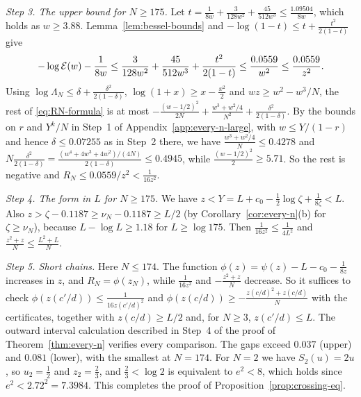 \emph{Step 3. The upper bound for $N\ge175$.} Let
$t=\frac1{8w}+\frac3{128w^2}+\frac{45}{512w^3}\le\frac{1.09504}{8w}$, which
holds as $w\ge3.88$. Lemma~\ref{lem:bessel-bounds} and
$-\log(1-t)\le t+\frac{t^2}{2(1-t)}$ give
\[
-\log \mathcal E(w)-\frac1{8w}\le\frac3{128w^2}+\frac{45}{512w^3}+\frac{t^2}{2(1-t)}\le\frac{0.0559}{w^2}
\le\frac{0.0559}{z^2}.
\]
Using $\log\Lambda_N\le\delta+\frac{\delta^2}{2(1-\delta)}$,
$\log(1+x)\ge x-\frac{x^2}2$ and $wz\ge w^2-w^3/N$, the rest of
\eqref{eq:RN-formula} is at most
$-\frac{(w-1/2)^2}{2N}+\frac{w^3+w^2/4}{N^2}+\frac{\delta^2}{2(1-\delta)}$. By
the bounds on $r$ and $Y^k/N$ in Step~1 of Appendix~\ref{app:every-n-large}, with
$w\le Y/(1-r)$ and hence $\delta\le0.07255$ as in Step~2 there, we have $\frac{w^3+w^2/4}N\le0.4278$ and
$N\frac{\delta^2}{2(1-\delta)}=\frac{(w^4+4w^3+4w^2)/(4N)}{2(1-\delta)}\le0.4945$,
while $\frac{(w-1/2)^2}2\ge5.71$. So the rest is negative and
$R_N\le0.0559/z^2<\frac1{16z^2}$.

\emph{Step 4. The form in $L$ for $N\ge175$.} We have
$z<Y=L+c_0-\frac12\log\zeta+\frac1{8\zeta}<L$. Also
$z>\zeta-0.1187\ge\nu_N-0.1187\ge L/2$ (by Corollary~\ref{cor:every-n}(b) for
$\zeta\ge\nu_N$), because $L-\log L\ge1.18$ for
$L\ge\log175$. Then $\frac1{16z^2}\le\frac1{4L^2}$ and
$\frac{z^2+z}N\le\frac{L^2+L}N$.

\emph{Step 5. Short chains.} Here $N\le174$. The function $\phi(z)=\psi(z)-L-c_0-\frac1{8z}$
increases in $z$, and $R_N=\phi(z_N)$, while $\frac1{16z^2}$ and
$-\frac{z^2+z}N$ decrease. So it suffices to check
$\phi(z(c'/d))\le\frac1{16z(c'/d)^2}$ and
$\phi(z(c/d))\ge-\frac{z(c/d)^2+z(c/d)}N$ with the certificates, together with
$z(c/d)\ge L/2$ and, for $N\ge3$, $z(c'/d)\le L$.
The outward interval calculation described in Step~4 of the proof of
Theorem~\ref{thm:every-n} verifies every comparison. The gaps exceed
$0.037$ (upper) and $0.081$ (lower), with the smallest at $N=174$. For $N=2$ we
have $S_2(u)=2u$, so $u_2=\frac12$ and $z_2=\frac23$, and $\frac23<\log2$ is
equivalent to $e^2<8$, which holds since $e^2<2.72^2=7.3984$. This completes the
proof of Proposition~\ref{prop:crossing-eq}.
